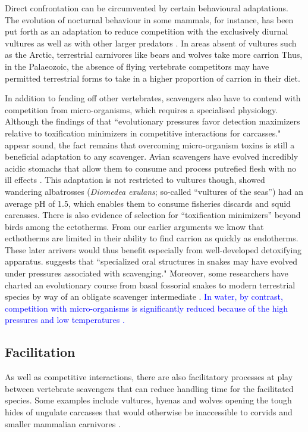 \documentclass[a4paper,12pt]{article}
\begin{document}
Direct confrontation can be circumvented by certain behavioural adaptations. 
The evolution of nocturnal behaviour in some mammals, for instance, has been put forth as an adaptation to reduce competition with the exclusively diurnal vultures as well as with other larger predators \citep{gittleman2013carnivore,moleon2014inter,pereira2014facultative}. 
In areas absent of vultures such as the Arctic, terrestrial carnivores like bears and wolves take more carrion \citep{devault2003scavenging}
Thus, in the Palaeozoic, the absence of flying vertebrate competitors may have permitted terrestrial forms to take in a higher proportion of carrion in their diet.

In addition to fending off other vertebrates, scavengers also have to contend with competition from micro-organisms, which requires a specialised physiology. 
Although the findings of \cite{shivik2006vultures} that ``evolutionary pressures favor detection maximizers relative to toxification minimizers in competitive interactions for carcasses." appear sound, the fact remains that overcoming micro-organism toxins is still a beneficial adaptation to any scavenger. 
Avian scavengers have evolved incredibly acidic stomachs that allow them to consume and process putrefied flesh with no ill effects \citep{houston1975digestive,roggenbuck2014microbiome}. 
This adaptation is not restricted to vultures though, \cite{gremillet2012vultures} showed wandering albatrosses (\textit{Diomedea exulans}; so-called ``vultures of the seas'') had an average pH of 1.5, which enables them to consume fisheries discards and squid carcasses. 
There is also evidence of selection for ``toxification minimizers'' beyond birds among the ectotherms.
From our earlier arguments we know that ecthotherms are limited in their ability to find carrion as quickly as endotherms. 
These later arrivers would thus benefit especially from well-developed detoxifying apparatus. 
\cite{shivik2006vultures} suggests that ``specialized oral structures in snakes may have evolved under pressures associated with scavenging."
Moreover, some researchers have charted an evolutionary course from basal fossorial snakes to modern terrestrial species by way of an obligate scavenger intermediate \citep{bauchot2006snakes}. 
\textcolor{blue}{In water, by contrast, competition with micro-organisms is significantly reduced because of the high pressures and low temperatures \citep{beasley2012carrion}.}

\subsection{Facilitation}
As well as competitive interactions, there are also facilitatory processes at play between vertebrate scavengers that can reduce handling time for the facilitated species. 
Some examples include vultures, hyenas and wolves opening the tough hides of ungulate carcasses that would otherwise be inaccessible to corvids and smaller mammalian carnivores \citep{selva2003scavenging,moleon2015carcass}. 
\end{document}
